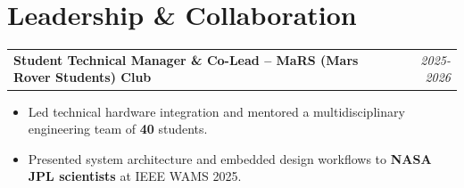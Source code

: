 \documentclass[a4paper,10.5pt]{article}
\begin{document}
\section*{Leadership \& Collaboration}

\noindent
\begin{tabularx}{\linewidth}{@{}X r@{}}
\textbf{Student Technical Manager \& Co-Lead -- MaRS (Mars Rover Students) Club} & \textit{2025-2026} \\
\end{tabularx}
\begin{itemize}[leftmargin=1.5em, itemsep=1pt]
    \item Led technical hardware integration and mentored a multidisciplinary engineering team of \textbf{40} students.
    \item Presented system architecture and embedded design workflows to \textbf{NASA JPL scientists} at IEEE WAMS 2025.
\end{itemize}
\end{document}
